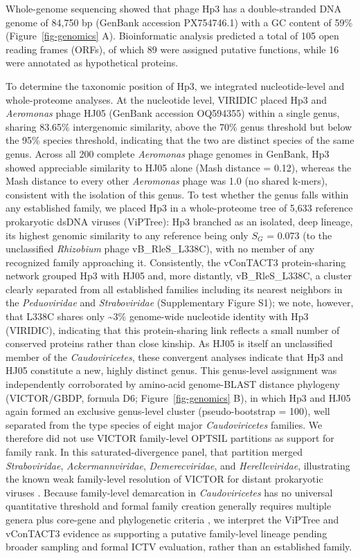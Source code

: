 Whole-genome sequencing showed that phage Hp3 has a
double-stranded DNA genome of 84,750 bp (GenBank accession PX754746.1)
with a GC content of 59\% (Figure~\ref{fig-genomics} A). Bioinformatic analysis predicted a total
of 105 open reading frames (ORFs), of which 89 were assigned putative
functions, while 16 were annotated as hypothetical proteins.

To determine the taxonomic position of Hp3, we integrated
nucleotide-level and whole-proteome analyses. At the
nucleotide level, VIRIDIC placed Hp3 and \emph{Aeromonas} phage HJ05
(GenBank accession OQ594355) within a single genus, sharing 83.65\%
intergenomic similarity, above the 70\% genus threshold but below the
95\% species threshold, indicating that the two are distinct species of
the same genus. Across all 200 complete
\emph{Aeromonas} phage genomes in GenBank, Hp3 showed appreciable
similarity to HJ05 alone (Mash distance = 0.12), whereas the Mash
distance to every other \emph{Aeromonas} phage was 1.0 (no shared
k-mers), consistent with the isolation of this genus. To test whether the
genus falls within any established family, we placed Hp3 in a
whole-proteome tree of 5,633 reference prokaryotic dsDNA viruses
(ViPTree): Hp3 branched as an isolated, deep lineage, its highest
genomic similarity to any reference being only \(S_G\) = 0.073 (to the
unclassified \emph{Rhizobium} phage vB\_RleS\_L338C), with no member of
any recognized family approaching it. Consistently, the vConTACT3
protein-sharing network grouped Hp3 with HJ05 and, more distantly,
vB\_RleS\_L338C, a cluster clearly separated from all established
families including its nearest neighbors in the \emph{Peduoviridae} and
\emph{Straboviridae} (Supplementary Figure S1); we note, however,
that L338C shares only \textasciitilde3\% genome-wide nucleotide
identity with Hp3 (VIRIDIC), indicating that this protein-sharing link
reflects a small number of conserved proteins rather than close kinship.
As HJ05 is itself an unclassified member of the \emph{Caudoviricetes},
these convergent analyses indicate that Hp3 and HJ05 constitute a new,
highly distinct genus. This genus-level assignment was independently
corroborated by amino-acid genome-BLAST distance phylogeny
(VICTOR/GBDP, formula D6; Figure~\ref{fig-genomics} B), in which Hp3 and HJ05 again formed an
exclusive genus-level cluster (pseudo-bootstrap = 100), well separated
from the type species of eight major \emph{Caudoviricetes} families. We
therefore did not use VICTOR family-level OPTSIL partitions as support
for family rank. In this saturated-divergence panel, that partition
merged \emph{Straboviridae}, \emph{Ackermannviridae},
\emph{Demerecviridae}, and \emph{Herelleviridae}, illustrating the
known weak family-level resolution of VICTOR for distant prokaryotic
viruses \citep{2017-VICTOR_Meier-Kolthoff}. Because family-level
demarcation in \emph{Caudoviricetes} has no universal quantitative
threshold and formal family creation generally requires multiple genera
plus core-gene and phylogenetic criteria
\citep{2021-Roadmap_Turner,2023-Abolishment_Turner}, we interpret the
ViPTree and vConTACT3 evidence as supporting a putative
family-level lineage pending broader sampling and formal ICTV
evaluation, rather than an established family.

